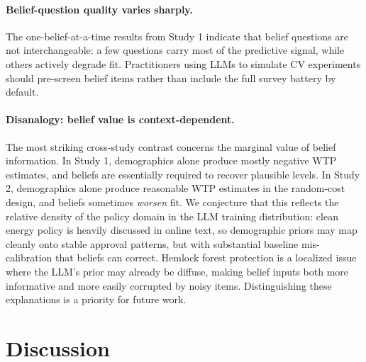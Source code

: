 \documentclass[12pt]{article}
\begin{document}
\paragraph{Belief-question quality varies sharply.} The
one-belief-at-a-time results from Study 1 indicate that belief questions
are not interchangeable: a few questions carry most of the predictive
signal, while others actively degrade fit. Practitioners using LLMs to
simulate CV experiments should pre-screen belief items rather than
include the full survey battery by default.

\paragraph{Disanalogy: belief value is context-dependent.} The most
striking cross-study contrast concerns the marginal value of belief
information. In Study 1, demographics alone produce mostly negative WTP
estimates, and beliefs are essentially required to recover plausible
levels. In Study 2, demographics alone produce reasonable WTP estimates
in the random-cost design, and beliefs sometimes \emph{worsen} fit. We
conjecture that this reflects the relative density of the policy domain
in the LLM training distribution: clean energy policy is heavily discussed
in online text, so demographic priors may map cleanly onto stable approval
patterns, but with substantial baseline mis-calibration that beliefs can
correct. Hemlock forest protection is a localized issue where the LLM's
prior may already be diffuse, making belief inputs both more informative
and more easily corrupted by noisy items. Distinguishing these
explanations is a priority for future work.

\label{tab:cross-study}


%

\section{Discussion}\label{sec:discussion}
\end{document}
